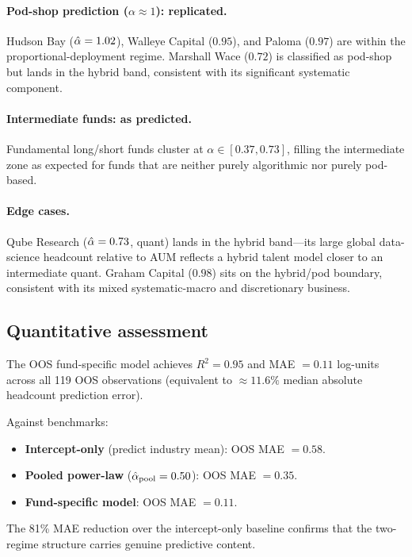 \paragraph{Pod-shop prediction ($\alpha \approx 1$): replicated.}
Hudson Bay ($\hat{\alpha} = 1.02$), Walleye Capital ($0.95$),
and Paloma ($0.97$) are within the proportional-deployment
regime.
Marshall Wace ($0.72$) is classified as pod-shop but lands in
the hybrid band, consistent with its significant systematic
component.

\paragraph{Intermediate funds: as predicted.}
Fundamental long/short funds cluster at
$\alpha \in [0.37, 0.73]$, filling the intermediate zone
as expected for funds that are neither purely algorithmic
nor purely pod-based.

\paragraph{Edge cases.}
Qube Research ($\hat{\alpha}=0.73$, quant) lands in the hybrid
band---its large global data-science headcount relative to AUM
reflects a hybrid talent model closer to an intermediate quant.
Graham Capital ($0.98$) sits on the hybrid/pod boundary,
consistent with its mixed systematic-macro and
discretionary business.

\subsection{Quantitative assessment}

The OOS fund-specific model achieves $R^2 = 0.95$ and
MAE $= 0.11$ log-units across all 119 OOS observations
(equivalent to ${\approx}11.6\%$ median absolute headcount
prediction error).

Against benchmarks:
\begin{itemize}\setlength\itemsep{1pt}
  \item \textbf{Intercept-only} (predict industry mean):
        OOS MAE $= 0.58$.
  \item \textbf{Pooled power-law} ($\hat{\alpha}_{\rm pool}=0.50$):
        OOS MAE $= 0.35$.
  \item \textbf{Fund-specific model}: OOS MAE $= 0.11$.
\end{itemize}
The 81\% MAE reduction over the intercept-only baseline confirms
that the two-regime structure carries genuine predictive content.


